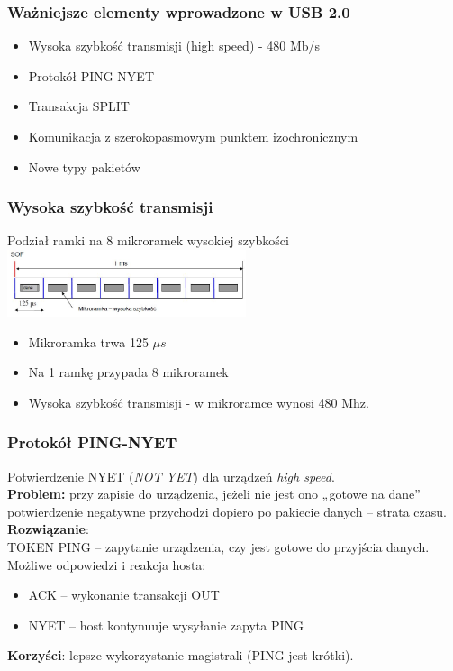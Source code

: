 	\subsubsection{Ważniejsze elementy wprowadzone w USB 2.0}
	\begin{itemize}
		\item Wysoka szybkość transmisji (high speed) - 480 Mb/s
		\item Protokół PING-NYET
		\item Transakcja SPLIT
		\item Komunikacja z szerokopasmowym punktem izochronicznym
		\item Nowe typy pakietów
	\end{itemize}
	\subsubsection{Wysoka szybkość transmisji}
	Podział ramki na 8 mikroramek wysokiej szybkości\\
	\includegraphics[width=7cm]{./wyklady/USB_53_1.jpg}
	\begin{itemize}
		\item Mikroramka trwa 125 $\mu s$
		\item Na 1 ramkę przypada 8 mikroramek
		\item Wysoka szybkość transmisji - w mikroramce wynosi 480 Mhz.
	\end{itemize}
	\subsubsection{Protokół PING-NYET}
	Potwierdzenie NYET (\emph{NOT YET}) dla urządzeń \emph{high speed}.\\
	\textbf{Problem:} przy zapisie do urządzenia, jeżeli nie jest ono „gotowe na dane” potwierdzenie negatywne przychodzi dopiero po pakiecie danych – strata czasu.\\
	\textbf{Rozwiązanie}:\\
	TOKEN PING – zapytanie urządzenia, czy jest gotowe do przyjścia danych.\\
	Możliwe odpowiedzi i reakcja hosta:
	\begin{itemize}
		\item ACK – wykonanie transakcji OUT
		\item NYET – host kontynuuje wysyłanie zapyta PING
	\end{itemize}
	\textbf{Korzyści}: lepsze wykorzystanie magistrali (PING jest krótki).
